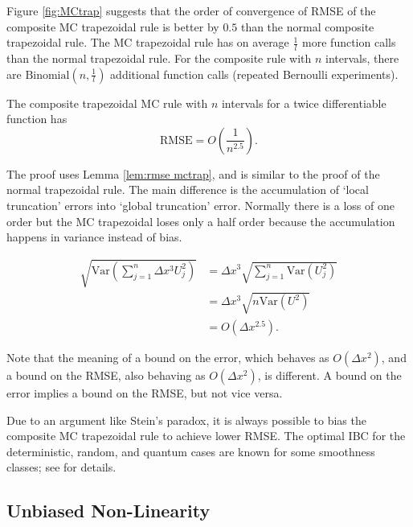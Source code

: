 \documentclass[a4paper,12pt]{article}
\begin{document}
Figure \ref{fig:MCtrap} suggests that the order of convergence of RMSE of the
composite MC trapezoidal rule is better by $0.5$ than the normal composite trapezoidal rule.
The MC trapezoidal rule has on average $\frac{1}{l}$ more function calls than
the normal trapezoidal rule. For the composite rule with $n$ intervals,
there are $\text{Binomial}(n,\frac{1}{l})$ additional function calls
(repeated Bernoulli experiments).\\

\begin{theorem} \label{thrm:order trap}
  The composite trapezoidal MC rule  with $n$ intervals
  for a twice differentiable function has
  \begin{equation}
    \text{RMSE} =O\left(\frac{1}{n^{2.5}} \right) .
  \end{equation}
\end{theorem}

The proof uses Lemma \ref{lem:rmse mctrap},
and is similar to the proof of the normal
trapezoidal rule. The main difference is the
accumulation of \enquote*{local truncation} errors into \enquote*{global truncation} error.
Normally there is a loss of one order but the MC trapezoidal loses only a half order
because the accumulation happens in variance instead of bias.

\begin{align}
  \sqrt{\text{Var}\left(\sum_{j=1}^{n}  \Delta x^{3}U_{j}^{2}\right)}
   & = \Delta x^{3} \sqrt{ \sum_{j=1}^{n}\text{Var} (U_{j}^{2})} \\
   & = \Delta x^{3} \sqrt{ n \text{Var}(U^{2})}                  \\
   & = O( \Delta x^{2.5}).
\end{align}

Note that the meaning of a bound on the error, which behaves as $O(\Delta x^{2})$,
and a bound on the RMSE, also behaving as $O(\Delta x^{2})$, is different.
A bound on the error implies a bound on the RMSE, but not vice versa.

\begin{related}
  Due to an argument like Stein's paradox,
  it is always possible to bias the composite MC trapezoidal
  rule to achieve lower RMSE.
  The optimal IBC for the deterministic, random, and quantum cases are known
  for some smoothness classes; see \cite{heinrich_optimal_2001} for details.
\end{related}


\subsection{Unbiased Non-Linearity}
\end{document}
